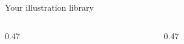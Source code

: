 \documentclass[aspectratio=169]{beamer}
\begin{document}
\begin{frame}{Your illustration library}
  \begin{columns}[c,onlytextwidth]
    \begin{column}{0.47\textwidth}
      \centering
      \alice[width=0.7\linewidth]
      \par\medskip
      \texttt{\string\alice[width=0.7\string\linewidth]}
    \end{column}
    \begin{column}{0.47\textwidth}
      \centering
      \cow[height=3cm]
      \par\medskip
      \texttt{\string\cow[height=3cm]}
    \end{column}
  \end{columns}
\end{frame}
\end{document}
